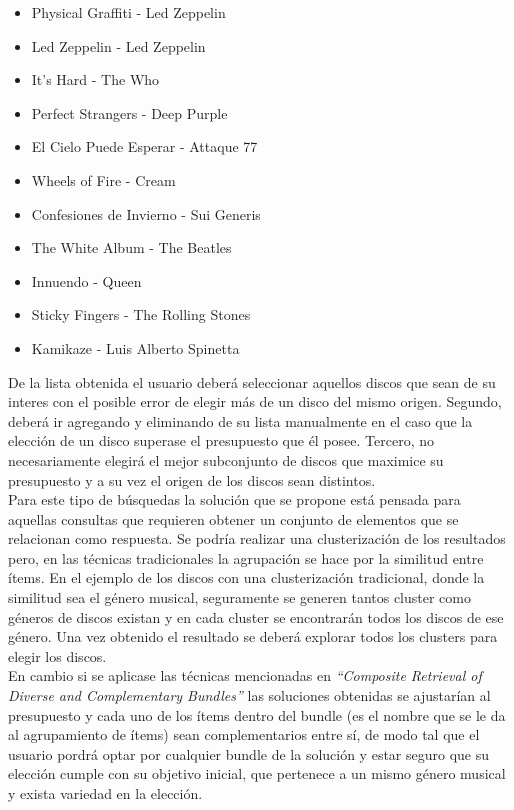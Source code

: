 \begin{itemize}
  \item Physical Graffiti - Led Zeppelin
  \item Led Zeppelin - Led Zeppelin
  \item It's Hard - The Who
  \item Perfect Strangers - Deep Purple
  \item El Cielo Puede Esperar - Attaque 77
  \item Wheels of Fire - Cream
  \item Confesiones de Invierno - Sui Generis
  \item The White Album - The Beatles
  \item Innuendo - Queen
  \item Sticky Fingers - The Rolling Stones
  \item Kamikaze - Luis Alberto Spinetta
\end{itemize}
De la lista obtenida el usuario deberá seleccionar aquellos discos que sean de su interes con el posible error de elegir más de un disco del mismo origen. Segundo, deberá ir agregando y eliminando de su lista manualmente en el caso que la elección de un disco superase el presupuesto que él posee. Tercero, no necesariamente elegirá el mejor subconjunto de discos que maximice su presupuesto y a su vez el origen de los discos sean distintos.\\
Para este tipo de búsquedas la solución que se propone está pensada para aquellas consultas que requieren obtener un conjunto de elementos que se relacionan como respuesta. Se podría realizar una clusterización de los resultados pero, en las técnicas tradicionales la agrupación se hace por la similitud entre ítems. En el ejemplo de los discos con una clusterización tradicional, donde la similitud sea el género musical, seguramente se generen tantos cluster como géneros de discos existan y en cada cluster se encontrarán todos los discos de ese género. Una vez obtenido el resultado se deberá explorar todos los clusters para elegir los discos.\\
En cambio si se aplicase las técnicas mencionadas en \textit{``Composite Retrieval of Diverse and Complementary Bundles''} las soluciones obtenidas se ajustarían al presupuesto y cada uno de los ítems dentro del bundle (es el nombre que se le da al agrupamiento de ítems) sean complementarios entre sí, de modo tal que el usuario pordrá optar por cualquier bundle de la solución y estar seguro que su elección cumple con su objetivo inicial, que pertenece a un mismo género musical y exista variedad en la elección.\\
